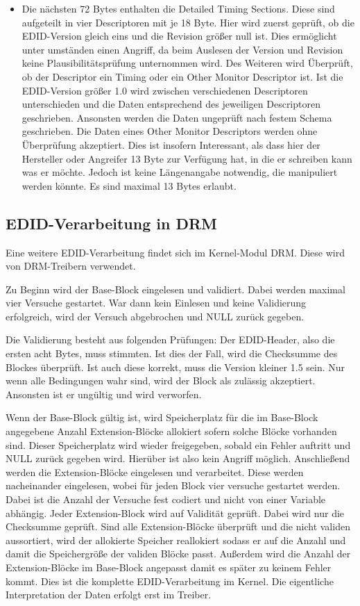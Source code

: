 \begin{itemize}
	\item 	Die nächsten 72 Bytes enthalten die Detailed Timing Sections. Diese sind aufgeteilt in vier Descriptoren  mit je 18 Byte. Hier wird zuerst geprüft, ob die EDID-Version gleich eins und die Revision größer null ist. Dies ermöglicht unter umständen einen Angriff, da beim Auslesen der Version und Revision keine Plausibilitätsprüfung unternommen wird. Des Weiteren wird Überprüft, ob der Descriptor ein Timing oder ein Other Monitor Descriptor ist.
	Ist die EDID-Version größer 1.0 wird zwischen verschiedenen Descriptoren unterschieden und die Daten entsprechend des jeweiligen Descriptoren geschrieben. Ansonsten werden die Daten ungeprüft nach festem Schema geschrieben. 
	Die Daten eines Other Monitor Descriptors werden ohne Überprüfung akzeptiert. Dies ist insofern Interessant, als dass hier der Hersteller oder Angreifer 13 Byte zur Verfügung hat, in die er schreiben kann was er möchte. Jedoch ist keine Längenangabe notwendig, die manipuliert werden könnte. Es sind maximal 13 Bytes erlaubt.
	
	
\end{itemize}





\subsection{EDID-Verarbeitung in DRM}
Eine weitere EDID-Verarbeitung findet sich im Kernel-Modul DRM. Diese wird von DRM-Treibern verwendet. 

Zu Beginn wird der Base-Block eingelesen und validiert. Dabei werden maximal vier Versuche gestartet.  War dann kein Einlesen und keine Validierung erfolgreich, wird der Versuch abgebrochen und NULL zurück gegeben.

Die Validierung besteht aus folgenden Prüfungen:
Der EDID-Header, also die ersten acht Bytes, muss stimmten. Ist dies der Fall, wird die Checksumme des Blockes überprüft. Ist auch diese korrekt, muss die Version kleiner 1.5 sein. Nur wenn alle Bedingungen wahr sind, wird der Block als zulässig akzeptiert. Ansonsten ist er ungültig und wird verworfen.

Wenn der Base-Block gültig ist, wird Speicherplatz für die im Base-Block angegebene Anzahl Extension-Blöcke allokiert sofern solche Blöcke vorhanden sind. Dieser Speicherplatz wird wieder freigegeben, sobald ein Fehler auftritt und NULL zurück gegeben wird. Hierüber ist also kein Angriff möglich.
Anschließend werden die  Extension-Blöcke eingelesen und verarbeitet. Diese werden nacheinander eingelesen, wobei für jeden Block vier versuche gestartet werden. Dabei ist die Anzahl der Versuche fest codiert und nicht von einer Variable abhängig. Jeder Extension-Block wird auf Validität geprüft.
Dabei wird nur die Checksumme geprüft.
Sind alle Extension-Blöcke überprüft und die nicht validen aussortiert, wird der allokierte Speicher reallokiert sodass er auf die Anzahl und damit die Speichergröße der validen Blöcke passt. Außerdem wird die Anzahl der Extension-Blöcke im Base-Block angepasst damit es später zu keinem Fehler kommt.
Dies ist die komplette EDID-Verarbeitung im Kernel. Die eigentliche Interpretation der Daten erfolgt erst im Treiber.

